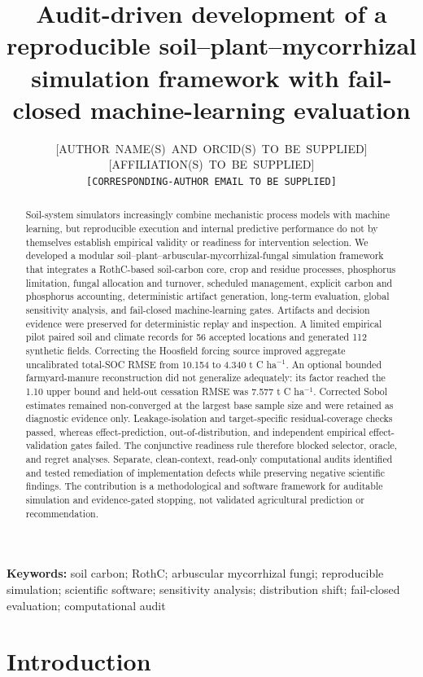 \documentclass[11pt]{article}
\title{Audit-driven development of a reproducible soil--plant--mycorrhizal simulation framework with fail-closed machine-learning evaluation}
\author{\mbox{[AUTHOR NAME(S) AND ORCID(S) TO BE SUPPLIED]}\\
\mbox{[AFFILIATION(S) TO BE SUPPLIED]}\\
\texttt{[CORRESPONDING-AUTHOR EMAIL TO BE SUPPLIED]}}
\date{}
\newcommand{\unitC}{t C ha$^{-1}$}
\begin{document}
\maketitle

\begin{abstract}
Soil-system simulators increasingly combine mechanistic process models with machine learning, but reproducible execution and internal predictive performance do not by themselves establish empirical validity or readiness for intervention selection. We developed a modular soil--plant--arbuscular-mycorrhizal-fungal simulation framework that integrates a RothC-based soil-carbon core, crop and residue processes, phosphorus limitation, fungal allocation and turnover, scheduled management, explicit carbon and phosphorus accounting, deterministic artifact generation, long-term evaluation, global sensitivity analysis, and fail-closed machine-learning gates. Artifacts and decision evidence were preserved for deterministic replay and inspection. A limited empirical pilot paired soil and climate records for 56 accepted locations and generated 112 synthetic fields. Correcting the Hoosfield forcing source improved aggregate uncalibrated total-SOC RMSE from 10.154 to 4.340 \unitC. An optional bounded farmyard-manure reconstruction did not generalize adequately: its factor reached the 1.10 upper bound and held-out cessation RMSE was 7.577 \unitC. Corrected Sobol estimates remained non-converged at the largest base sample size and were retained as diagnostic evidence only. Leakage-isolation and target-specific residual-coverage checks passed, whereas effect-prediction, out-of-distribution, and independent empirical effect-validation gates failed. The conjunctive readiness rule therefore blocked selector, oracle, and regret analyses. Separate, clean-context, read-only computational audits identified and tested remediation of implementation defects while preserving negative scientific findings. The contribution is a methodological and software framework for auditable simulation and evidence-gated stopping, not validated agricultural prediction or recommendation.
\end{abstract}

\noindent\textbf{Keywords:} soil carbon; RothC; arbuscular mycorrhizal fungi; reproducible simulation; scientific software; sensitivity analysis; distribution shift; fail-closed evaluation; computational audit

\section{Introduction}
\end{document}
